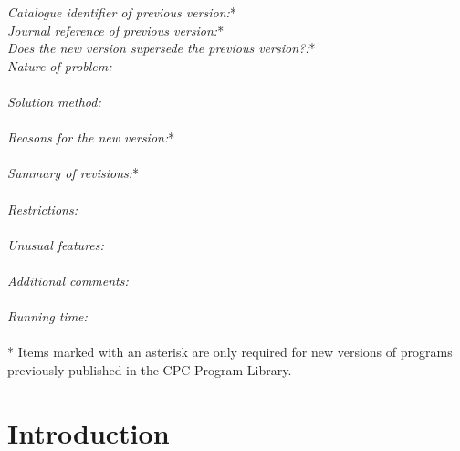 \documentclass[preprint,12pt]{elsarticle}
\begin{document}
\begin{small}
{\em Catalogue identifier of previous version:}*              \\
{\em Journal reference of previous version:}*                  \\
{\em Does the new version supersede the previous version?:}*   \\
{\em Nature of problem:}\\
   \\
{\em Solution method:}\\
   \\
{\em Reasons for the new version:}*\\
   \\
{\em Summary of revisions:}*\\
   \\
{\em Restrictions:}\\
   \\
{\em Unusual features:}\\
   \\
{\em Additional comments:}\\
   \\
{\em Running time:}\\
   \\
* Items marked with an asterisk are only required for new versions
of programs previously published in the CPC Program Library.\\
\end{small}


\section{Introduction}\label{sec:intro}
\end{document}
